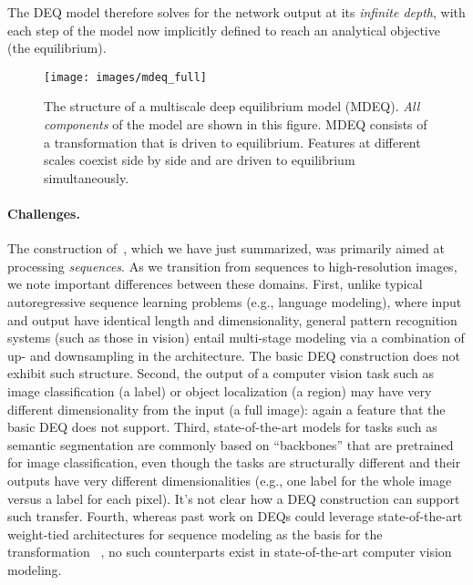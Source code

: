 \documentclass{article}
\begin{document}
The DEQ model therefore solves for the network output at its \emph{infinite depth}, with each step of the model now implicitly defined to reach an analytical objective (the equilibrium).


\begin{figure}[t]
\centering
\texttt{[image: images/mdeq\_full]}
\caption{The structure of a multiscale deep equilibrium model (MDEQ). \emph{All components} of the model are shown in this figure. MDEQ consists of a transformation  that is driven to equilibrium. Features at different scales coexist side by side and are driven to equilibrium simultaneously.}
\label{fig:mdeq-full}
\vspace{-.2in}
\end{figure}

\vspace{-.1in}
\paragraph{Challenges.} The construction of~\citet{bai2019deep}, which we have just summarized, was primarily aimed at processing \emph{sequences}. As we transition from sequences to high-resolution images, we note important differences between these domains. First, unlike typical autoregressive sequence learning problems (e.g., language modeling), where input and output have identical length and dimensionality, general pattern recognition systems (such as those in vision) entail multi-stage modeling via a combination of up- and downsampling in the architecture. The basic DEQ construction does not exhibit such structure. Second, the output of a computer vision task such as image classification (a label) or object localization (a region) may have very different dimensionality from the input (a full image): again a feature that the basic DEQ does not support. Third, state-of-the-art models for tasks such as semantic segmentation are commonly based on ``backbones'' that are pretrained for image classification, even though the tasks are structurally different and their outputs have very different dimensionalities (e.g., one label for the whole image versus a label for each pixel). It's not clear how a DEQ construction can support such transfer. Fourth, whereas past work on DEQs could leverage state-of-the-art weight-tied architectures for sequence modeling as the basis for the transformation ~\cite{bai2018trellis,dehghani2018universal}, no such counterparts exist in state-of-the-art computer vision modeling.
\end{document}
